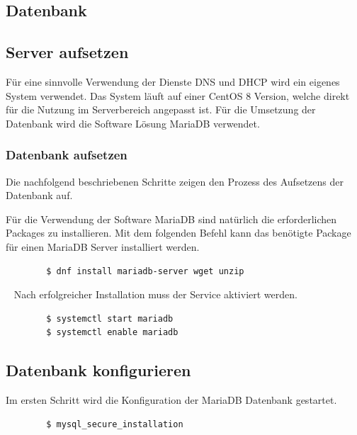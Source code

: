 \documentclass{scrartcl}
\begin{document}
\begin{flushleft}
    \newpage

    \section{Datenbank}
    \subsection{Server aufsetzen}
    Für eine sinnvolle Verwendung der Dienste DNS und DHCP wird ein eigenes System verwendet. Das System läuft auf einer CentOS 8 Version, welche direkt für die Nutzung im Serverbereich angepasst ist. Für die Umsetzung der Datenbank wird die Software Lösung MariaDB verwendet.
    \subsubsection{Datenbank aufsetzen}
    Die nachfolgend beschriebenen Schritte zeigen den Prozess des Aufsetzens der Datenbank auf. \newline
    
    Für die Verwendung der Software MariaDB sind natürlich die erforderlichen Packages zu installieren. 
    Mit dem folgenden Befehl kann das benötigte Package für einen MariaDB Server installiert werden.
    \begin{lstlisting}
        $ dnf install mariadb-server wget unzip    \end{lstlisting} 
    \ \newline
    Nach erfolgreicher Installation muss der Service aktiviert werden.    
    \begin{lstlisting}
        $ systemctl start mariadb
        $ systemctl enable mariadb    \end{lstlisting}
    
    \subsection{Datenbank konfigurieren}
    Im ersten Schritt wird die Konfiguration der MariaDB Datenbank gestartet.
    \begin{lstlisting}
        $ mysql_secure_installation \end{lstlisting}


\end{flushleft}
\end{document}
